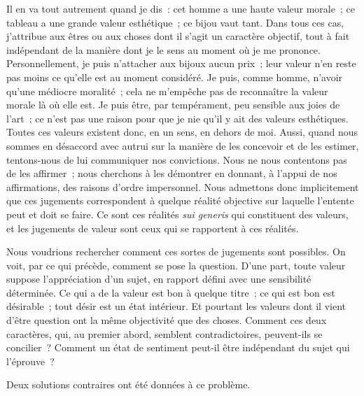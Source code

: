 \documentclass[french,twoside]{book} %
\begin{document}
Il en va tout autrement quand je dis : cet homme a une haute valeur morale ; ce tableau a une grande valeur esthétique ; ce bijou vaut tant. Dans tous ces cas, j’attribue aux êtres ou aux choses dont il s’agit un caractère objectif, tout à fait indépendant de la manière dont je le sens au moment où je me prononce. Personnellement, je puis n’attacher aux bijoux aucun prix ; leur valeur n’en reste pas moins ce qu’elle est au moment considéré. Je puis, comme homme, n’avoir qu’une médiocre moralité ; cela ne m’empêche pas de reconnaître la valeur morale là où elle est. Je puis être, par tempérament, peu sensible aux joies de l’art ; ce n’est pas une raison pour que je nie qu’il y ait des valeurs esthétiques. Toutes ces valeurs existent donc, en un sens, en dehors de moi. Aussi, quand nous sommes en désaccord avec autrui sur la manière de les concevoir et de les estimer, tentons-nous de lui communiquer nos convictions. Nous ne nous contentons pas de les affirmer ; nous cherchons à les démontrer en donnant, à l’appui de nos affirmations, des raisons d’ordre impersonnel. Nous admettons donc implicitement que ces jugements correspondent à quelque réalité objective sur laquelle l’entente peut et doit se faire. Ce sont ces réalités {\itshape sui generis} qui constituent des valeurs, et les jugements de valeur sont ceux qui se rapportent à ces réalités.\par
Nous voudrions rechercher comment ces sortes de jugements sont possibles. On voit, par ce qui précède, comment se pose la question. D’une part, toute valeur suppose l’appréciation d’un sujet, en rapport défini avec une sensibilité déterminée. Ce qui a de la valeur est bon à quelque titre ; ce qui est bon est désirable ; tout désir est un état intérieur. Et pourtant les valeurs dont il vient d’être question ont la même objectivité que des choses. Comment ces deux caractères, qui, au premier abord, semblent contradictoires, peuvent-ils se concilier ? Comment un état de sentiment peut-il être indépendant du sujet qui l’éprouve ?\par
Deux solutions contraires ont été données à ce problème.\par
\end{document}

